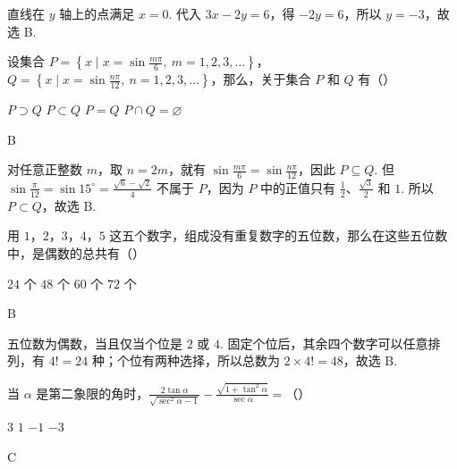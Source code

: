 \documentclass[UTF8,a4paper,oneside,11pt]{ctexbook}
\begin{document}
\begin{solution}
直线在 \(y\) 轴上的点满足 \(x=0\). 代入 \(3x-2y=6\)，得 \(-2y=6\)，所以 \(y=-3\)，故选 B.
\end{solution}

\begin{problem}
设集合 \(P = \left\{x \mid x = \sin \frac{m\pi}{6},\ m = 1,2,3,\dots\right\}\)，\(Q = \left\{x \mid x = \sin \frac{n\pi}{12},\ n = 1,2,3,\dots\right\}\)，那么，关于集合 \(P\) 和 \(Q\) 有（\quad）

\choices
    {\(P \supset Q\)}
    {\(P \subset Q\)}
    {\(P = Q\)}
    {\(P \cap Q = \varnothing\)}
\end{problem}

\begin{answer}
B
\end{answer}

\begin{solution}
对任意正整数 \(m\)，取 \(n=2m\)，就有 \(\sin\frac{m\pi}{6}=\sin\frac{n\pi}{12}\)，因此 \(P\subseteq Q\). 但 \(\sin\frac{\pi}{12}=\sin15^\circ=\frac{\sqrt6-\sqrt2}{4}\) 不属于 \(P\)，因为 \(P\) 中的正值只有 \(\frac12\)、\(\frac{\sqrt3}{2}\) 和 \(1\). 所以 \(P\subset Q\)，故选 B.
\end{solution}

\begin{problem}
用 \(1\)，\(2\)，\(3\)，\(4\)，\(5\) 这五个数字，组成没有重复数字的五位数，那么在这些五位数中，是偶数的总共有（\quad）

\choices
    {\(24\) 个}
    {\(48\) 个}
    {\(60\) 个}
    {\(72\) 个}
\end{problem}

\begin{answer}
B
\end{answer}

\begin{solution}
五位数为偶数，当且仅当个位是 \(2\) 或 \(4\). 固定个位后，其余四个数字可以任意排列，有 \(4!=24\) 种；个位有两种选择，所以总数为 \(2\times4!=48\)，故选 B.
\end{solution}

\begin{problem}
当 \(\alpha\) 是第二象限的角时，\(\frac{2\tan \alpha}{\sqrt{\sec^2 \alpha - 1}} - \frac{\sqrt{1 + \tan^2 \alpha}}{\sec \alpha} =\)（\quad）

\choices
    {\(3\)}
    {\(1\)}
    {\(-1\)}
    {\(-3\)}
\end{problem}

\begin{answer}
C
\end{answer}
\end{document}
